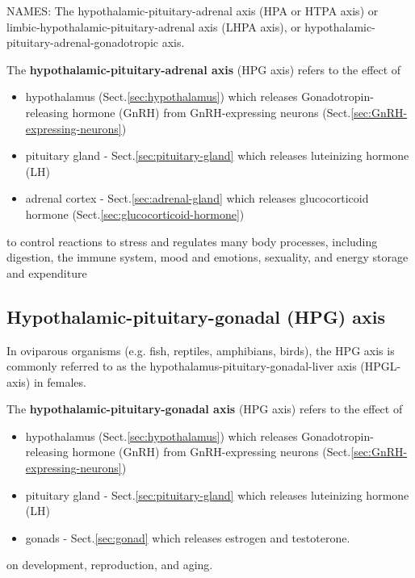 NAMES: The hypothalamic-pituitary-adrenal axis (HPA or HTPA axis)
or limbic-hypothalamic-pituitary-adrenal axis (LHPA axis), or
hypothalamic-pituitary-adrenal-gonadotropic axis.


The {\bf hypothalamic-pituitary-adrenal axis} (HPG axis)
refers to the effect of 
\begin{itemize}
  \item hypothalamus (Sect.\ref{sec:hypothalamus})
  which releases  Gonadotropin-releasing hormone (GnRH)
  from  GnRH-expressing neurons (Sect.\ref{sec:GnRH-expressing-neurons})
  
  \item pituitary gland - Sect.\ref{sec:pituitary-gland}
  which releases luteinizing hormone (LH)
  
  \item adrenal cortex - Sect.\ref{sec:adrenal-gland} which releases
  glucocorticoid hormone (Sect.\ref{sec:glucocorticoid-hormone})
  
\end{itemize} 
to control reactions to stress and regulates many body processes,
including digestion, the immune system, mood and emotions, sexuality, and energy
storage and expenditure

 

\subsection{Hypothalamic-pituitary-gonadal (HPG) axis}
\label{sec:HPG-axis}

In oviparous organisms (e.g. fish, reptiles, amphibians, birds), the HPG axis is
commonly referred to as the hypothalamus-pituitary-gonadal-liver axis
(HPGL-axis) in females.


The {\bf hypothalamic-pituitary-gonadal axis} (HPG axis)
refers to the effect of 
\begin{itemize}
  \item hypothalamus (Sect.\ref{sec:hypothalamus})
  which releases  Gonadotropin-releasing hormone (GnRH)
  from  GnRH-expressing neurons (Sect.\ref{sec:GnRH-expressing-neurons})
  
  \item pituitary gland - Sect.\ref{sec:pituitary-gland}
  which releases luteinizing hormone (LH)
  
  \item gonads - Sect.\ref{sec:gonad} 
  which releases estrogen and testoterone.
  
\end{itemize} 
on development, reproduction, and aging.

